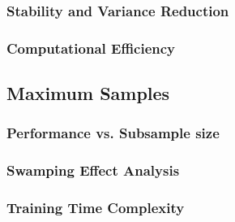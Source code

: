 \documentclass[10pt, conference]{IEEEtran}
\begin{document}



\subsubsection{Stability and Variance Reduction}




\subsubsection{Computational Efficiency}




\subsection{Maximum Samples}
\subsubsection{Performance vs. Subsample size}





\subsubsection{Swamping Effect Analysis}




\subsubsection{Training Time Complexity}
\end{document}
